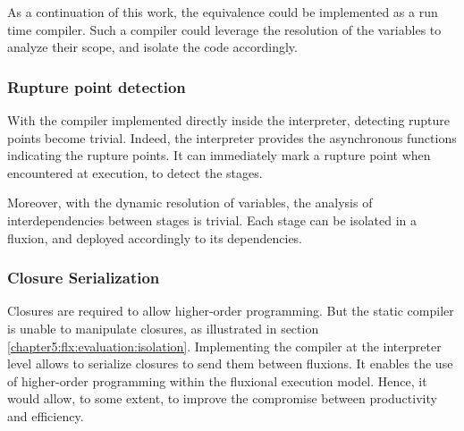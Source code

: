 As a continuation of this work, the equivalence could be implemented as a run time compiler.
Such a compiler could leverage the resolution of the variables to analyze their scope, and isolate the code accordingly.

\subsubsection{Rupture point detection}

With the compiler implemented directly inside the interpreter, detecting rupture points become trivial.
Indeed, the interpreter provides the asynchronous functions indicating the rupture points.
It can immediately mark a rupture point when encountered at execution, to detect the stages.

Moreover, with the dynamic resolution of variables, the analysis of interdependencies between stages is trivial.
Each stage can be isolated in a fluxion, and deployed accordingly to its dependencies.


\subsubsection{Closure Serialization}

Closures are required to allow higher-order programming.
But the static compiler is unable to manipulate closures, as illustrated in section \ref{chapter5:flx:evaluation:isolation}.
Implementing the compiler at the interpreter level allows to serialize closures to send them between fluxions.
It enables the use of higher-order programming within the fluxional execution model.
Hence, it would allow, to some extent, to improve the compromise between productivity and efficiency.

